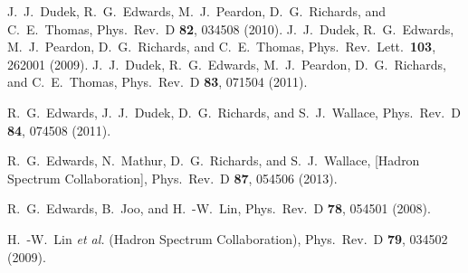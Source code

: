 \documentclass[showkeys,aps,twocolumn,showpacs,preprintnumbers,amsmath,amssymb,prd,letterpaper,floatfix,nofootinbib,superscriptaddress,]{revtex4-1}
\begin{document}
{\begin{thebibliography}{99}
  J.~J.~Dudek, R.~G.~Edwards, M.~J.~Peardon, D.~G.~Richards, and C.~E.~Thomas,
  Phys.\ Rev.\ D {\bf 82}, 034508 (2010).
%
  J.~J.~Dudek, R.~G.~Edwards, M.~J.~Peardon, D.~G.~Richards, and C.~E.~Thomas,
  Phys.\ Rev.\ Lett.\  {\bf 103}, 262001 (2009).
%
  J.~J.~Dudek, R.~G.~Edwards, M.~J.~Peardon, D.~G.~Richards, and C.~E.~Thomas,
  Phys.\ Rev.\ D {\bf 83}, 071504 (2011).


  R.~G.~Edwards, J.~J.~Dudek, D.~G.~Richards, and S.~J.~Wallace,
  Phys.\ Rev.\ D {\bf 84}, 074508 (2011).


  R.~G.~Edwards,  N.~Mathur, D.~G.~Richards, and S.~J.~Wallace,
  [Hadron Spectrum Collaboration],
  Phys.\ Rev.\ D {\bf 87}, 054506 (2013).


  R.~G.~Edwards, B.~Joo, and H.~-W.~Lin,
  Phys.\ Rev.\ D {\bf 78}, 054501 (2008).

  H.~-W.~Lin {\it et al.} (Hadron Spectrum Collaboration),
  Phys.\ Rev.\ D {\bf 79}, 034502 (2009).


\end{thebibliography}}
\end{document}

